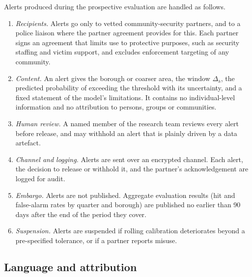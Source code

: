 Alerts produced during the prospective evaluation are handled as follows.
\begin{enumerate}[1.]
  \item \emph{Recipients.} Alerts go only to vetted community-security
  partners, and to a police liaison where the partner agreement provides for
  this. Each partner signs an agreement that limits use to protective
  purposes, such as security staffing and victim support, and excludes
  enforcement targeting of any community.
  \item \emph{Content.} An alert gives the borough or coarser area, the
  window $\Delta_{\mathrm a}$, the predicted probability of exceeding the threshold
  with its uncertainty, and a fixed statement of the model's limitations.
  It contains no individual-level information and no attribution to
  persons, groups or communities.
  \item \emph{Human review.} A named member of the research team reviews
  every alert before release, and may withhold an alert that is plainly
  driven by a data artefact.
  \item \emph{Channel and logging.} Alerts are sent over an encrypted
  channel. Each alert, the decision to release or withhold it, and the
  partner's acknowledgement are logged for audit.
  \item \emph{Embargo.} Alerts are not published. Aggregate evaluation
  results (hit and false-alarm rates by quarter and borough) are published
  no earlier than 90 days after the end of the period they cover.
  \item \emph{Suspension.} Alerts are suspended if rolling calibration
  deteriorates beyond a pre-specified tolerance, or if a partner reports
  misuse.
\end{enumerate}

\subsection{Language and attribution}\label{sec:ethics-language}

